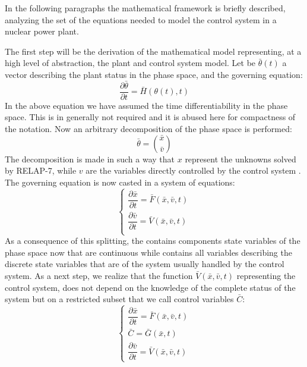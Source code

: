 \documentclass{mc2013}
\begin{document}
In the following paragraphs the mathematical framework is briefly described, analyzing the set of the
equations needed to model the control system in a nuclear power plant.

\label{sec:PlantControlModel}
The first step will be the derivation of the mathematical model representing, at a high level of abstraction,
the plant and control system model. Let be $\bar{\theta}(t)$ a vector describing the plant status in the phase space, and the governing equation:
\begin{equation}
\frac{\partial \bar{\theta}}{\partial t} = \bar{H}(\theta(t),t)
\label{eq:SystemDynamics}
\end{equation}
In the above equation we have assumed the time differentiability in the phase space. This is in generally
not required and it is abused here for compactness of the notation. Now an arbitrary decomposition of the
phase space is performed:
\begin{equation}
\bar{\theta}=\binom{\bar{x}}{\bar{v}}
\label{eq:firstDecomposition}
\end{equation}
The decomposition is made in such a way that $x$ represent the unknowns solved by RELAP-7, while $v$ are the variables directly controlled by the control system . The governing equation is now casted in a system of equations:
\begin{equation}
\begin{cases} 
\dfrac{\partial \bar{x}}{\partial t} = \bar{F}(\bar{x},\bar{v},t) \\ 
\dfrac{\partial \bar{v}}{\partial t} = \bar{V}(\bar{x},\bar{v},t) \\
\end{cases}
\label{eq:generalSystemEquation}
\end{equation}
As a consequence of this splitting, the contains components state variables of the phase space now that
are continuous while contains all variables describing the discrete state variables that are of the system
usually handled by the control system. As a next step, we realize that the function 
$\bar{V}(\bar{x},\bar{v},t)$ 
representing the control system, does not depend on the knowledge of the complete status of the system but on a restricted subset that we call control variables $\bar{C}$:
\begin{equation}
\begin{cases} 
\dfrac{\partial \bar{x}}{\partial t} = \bar{F}(\bar{x},\bar{v},t) \\
\bar{C} = \bar{G}(\bar{x},t) \\ 
\dfrac{\partial \bar{v}}{\partial t} = \bar{V}(\bar{x},\bar{v},t) 
\end{cases}
\label{eq:generalSystemEquationwithControl}
\end{equation}
\end{document}

